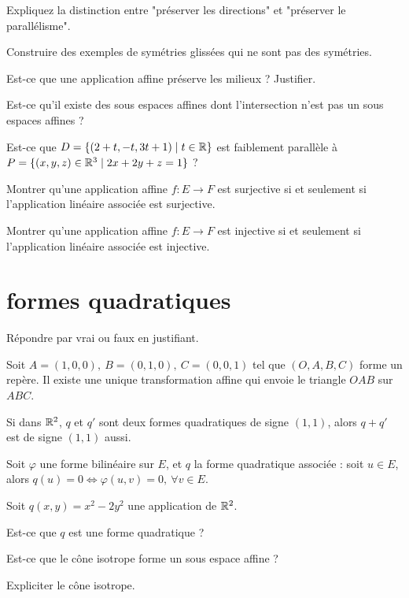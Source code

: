 \item Expliquez la distinction entre "préserver les directions" et "préserver le parallélisme".
\item Construire des exemples de symétries glissées qui ne sont pas des symétries.
\item Est-ce que une application affine préserve les milieux ? Justifier.
\item Est-ce qu'il existe des sous espaces affines dont l'intersection n'est pas un sous espaces affines ? 
\item Est-ce que $D = \{(2+t,-t,3t+1) \mid t \in \mathbb{R} \}$ est faiblement parallèle à $P = \{(x,y,z) \in \mathbb{R}^3 \mid 2x+2y+z = 1\}$ ?
\item Montrer qu'une application affine $f : E \to F$ est surjective si et seulement si l'application linéaire associée est surjective.
\item Montrer qu'une application affine $f : E \to F$ est injective si et seulement si l'application linéaire associée est injective.
\een
\ee



\newpage
\section{formes quadratiques}
Répondre par vrai ou faux en justifiant.
\ben
\item Soit $A = (1,0,0), ~ B = (0,1,0), ~ C = (0,0,1)$ tel que $(O,A,B,C)$ forme un repère. Il existe une unique transformation affine qui envoie le triangle $OAB$ sur $ABC$.
\item Si dans $\mathbb{R}^2$, $q$ et $q'$ sont deux formes quadratiques de signe $(1,1)$, alors $q+q'$ est de signe $(1,1)$ aussi.
\item Soit $\varphi$ une forme bilinéaire sur $E$, et $q$ la forme quadratique associée : soit $u \in E$, alors $q(u) = 0 \iff \varphi(u,v) = 0, ~ \forall v \in E$.
\een
\ee

\medskip

\be
Soit $q(x,y) = x^2 -2y^2$ une application de $\mathbb{R}^2$. 
\ben
\item Est-ce que $q$ est une forme quadratique ?
\item Est-ce que le cône isotrope forme un sous espace affine ?
\item Expliciter le cône isotrope.
\een
\ee















